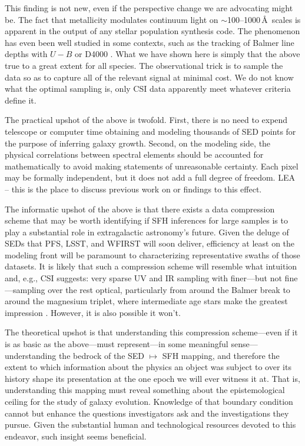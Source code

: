 \documentclass[a4paper,fleqn,usenatbib]{mnras}
\newcommand{\bfb}{\color{myblue}}
\begin{document}
This finding is not new, even if the perspective change we are advocating might be. The fact that 
metallicity modulates continuum light on $\sim$100--1000\,\AA\ scales is apparent in the
output of any stellar population synthesis code. The phenomenon has even been well studied in 
some contexts, such as the tracking of Balmer line depths with $U-B$ or D4000 
\citep[e.g.,][]{Kauffmann03}. What we have shown here is simply that the above true to a great 
extent for all species. The observational trick is to sample the data so as to capture all
of the relevant signal at minimal cost. We do not know what the optimal sampling is, only CSI 
data apparently meet whatever criteria define it.

The practical upshot of the above is twofold. First, there is no need to expend telescope
or computer time obtaining and modeling thousands of SED points for the purpose of inferring 
galaxy growth. Second, on the modeling side, the physical correlations between spectral
elements should be accounted for mathematically to avoid making statements of unreasonable 
certainty. Each pixel may be formally independent, but it does not add a full degree of freedom.
{\bfb LEA -- this is the place to discuss previous work on or findings to this effect.}

The informatic upshot of the above is that there exists a data compression scheme that may be
worth identifying if SFH inferences for large samples is to play a substantial role in extragalactic 
astronomy's future. Given the deluge of SEDs that PFS, LSST, and WFIRST will soon deliver, 
efficiency at least on the modeling front will be paramount to characterizing representative
swaths of those datasets. It is likely that such a compression scheme will resemble what intuition
and, e.g., CSI suggests: very sparse UV and IR sampling with finer---but not fine---sampling over
the rest optical, particularly from around the Balmer break to around the magnesium triplet,
where intermediate age stars make the greatest impression \citep[e.g.,][]{Dressler16}. However,
it is also possible it won't.

The theoretical upshot is that understanding this compression scheme---even if it is as basic 
as the above---must represent---in some meaningful sense---understanding the bedrock of
the SED $\mapsto$ SFH mapping, and therefore the extent to which information about the
physics an object was subject to over its history shape its presentation at the one epoch we 
will ever witness it at. That is, understanding this mapping must reveal something about the
epistemological ceiling for the study of galaxy evolution. Knowledge of that boundary condition 
cannot but enhance the questions investigators ask and the investigations they pursue. Given 
the substantial human and technological resources devoted to this endeavor, such insight
seems beneficial.
\end{document}
